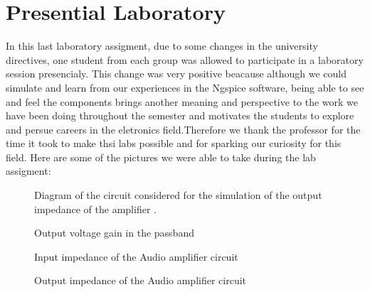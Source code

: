 \section{Presential Laboratory}
\label{sec:Presencial}

In this last laboratory assigment, due to some changes in the university directives, one student from each group was allowed to participate in a laboratory session presencialy. This change was very positive beacause although we could simulate and learn from our experiences in the Ngspice software, being able to see and feel the components brings another meaning and perspective to the work we have been doing throughout the semester and motivates the students to explore and persue careers in the eletronics field.Therefore we thank the professor for the time it took to make thsi labs possible and for sparking our curiosity for this field. Here are some of the pictures we were able to take during the lab assigment:  

\begin{figure}[H] \centering
\vspace{-10cm}
\caption{Diagram of the circuit considered for the simulation of the output impedance of the amplifier .}
\label{fig:diagram_t4_zout}
\end{figure}

  
\begin{figure}[H] \centering
\vspace{-1cm}
\caption{Output voltage gain in the passband}
\label{fig:gain_sim}
\end{figure}


\begin{figure}[H] \centering
\caption{Input impedance of the Audio amplifier circuit}
\label{fig:In_imp}
\end{figure}
\vspace{-3cm}


\begin{figure}[H] \centering
\caption{Output impedance of the Audio amplifier circuit}
\label{fig:out_imp}
\end{figure}
\vspace{-3cm}


\pagebreak
